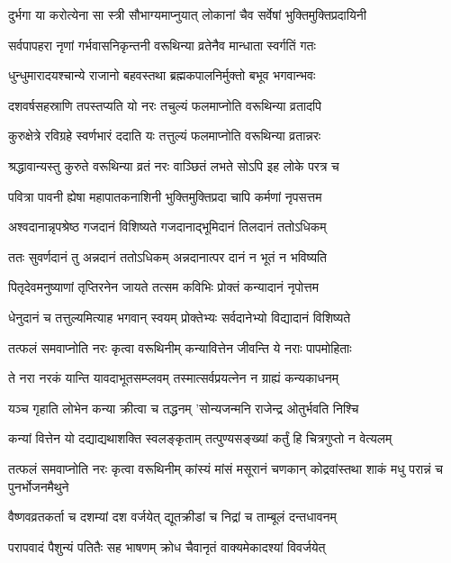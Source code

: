 \twolineshloka
{दुर्भगा या करोत्येना सा स्त्री सौभाग्यमाप्नुयात्}
{लोकानां चैव सर्वेषां भुक्तिमुक्तिप्रदायिनी} %

\twolineshloka
{सर्वपापहरा नृणां गर्भवासनिकृन्तनी}
{वरूथिन्या व्रतेनैव मान्धाता स्वर्गतिं गतः} %

\twolineshloka
{धुन्धुमारादयश्चान्ये राजानो बहवस्तथा}
{ब्रह्मकपालनिर्मुक्तो बभूव भगवान्भवः} %

\twolineshloka
{दशवर्षसहस्राणि तपस्तप्यति यो नरः}
{तचुल्यं फलमाप्नोति वरूथिन्या व्रतादपि} %

\twolineshloka
{कुरुक्षेत्रे रविग्रहे स्वर्णभारं ददाति यः}
{तत्तुल्यं फलमाप्नोति वरूथिन्या व्रतान्नरः} %

\twolineshloka
{श्रद्धावान्यस्तु कुरुते वरूथिन्या व्रतं नरः}
{वाञ्छितं लभते सोऽपि इह लोके परत्र च} %

\twolineshloka
{पवित्रा पावनी ह्येषा महापातकनाशिनी}
{भुक्तिमुक्तिप्रदा चापि कर्मणां नृपसत्तम} %

\twolineshloka
{अश्वदानान्नृपश्रेष्ठ गजदानं विशिष्यते}
{गजदानाद्भूमिदानं तिलदानं ततोऽधिकम्} %

\twolineshloka
{ततः सुवर्णदानं तु अन्नदानं ततोऽधिकम्}
{अन्नदानात्पर दानं न भूतं न भविष्यति} %

\twolineshloka
{पितृदेवमनुष्याणां तृप्तिरनेन जायते}
{तत्सम कविभिः प्रोक्तं कन्यादानं नृपोत्तम} %

\twolineshloka
{धेनुदानं च तत्तुल्यमित्याह भगवान् स्वयम्}
{प्रोक्तेभ्यः सर्वदानेभ्यो विद्यादानं विशिष्यते} %

\twolineshloka
{तत्फलं समवाप्नोति नरः कृत्वा वरूथिनीम्}
{कन्यावित्तेन जीवन्ति ये नराः पापमोहिताः} %

\twolineshloka
{ते नरा नरकं यान्ति यावदाभूतसम्प्लवम्}
{तस्मात्सर्वप्रयत्नेन न ग्राह्यं कन्यकाधनम्} %

\twolineshloka
{यञ्च गृहाति लोभेन कन्या क्रीत्वा च तद्धनम्}
{'सोन्यजन्मनि राजेन्द्र ओतुर्भवति निश्चि} %

\twolineshloka
{कन्यां वित्तेन यो दद्याद्यथाशक्ति स्वलङ्कृताम्}
{तत्पुण्यसङ्ख्यां कर्तुं हि चित्रगुप्तो न वेत्यलम्} %


\threelineshloka
{तत्फलं समवाप्नोति नरः कृत्वा वरूथिनीम्}
{कांस्यं मांसं मसूरानं चणकान् कोद्रवांस्तथा}
{शाकं मधु परान्नं च पुनर्भोजनमैथुने} %

\twolineshloka
{वैष्णवव्रतकर्ता च दशम्यां दश वर्जयेत्}
{द्यूतक्रीडां च निद्रां च ताम्बूलं दन्तधावनम्} %

\twolineshloka
{परापवादं पैशुन्यं पतितैः सह भाषणम्}
{क्रोध चैवानृतं वाक्यमेकादश्यां विवर्जयेत्} %

